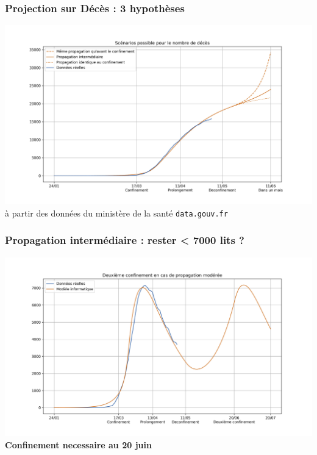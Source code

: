 \documentclass[a4paper]{cours-bdd}
\begin{document}

\begin{frame}[fragile]
\frametitle{Projection sur Décès : 3 hypothèses}

  \begin{center}
    \includegraphics[width=1.0\linewidth]{figure4.jpg} \\
    {\tiny à partir des données du ministère de la santé \texttt{data.gouv.fr}}
  \end{center}
  
\end{frame}


\begin{frame}[fragile]
\frametitle{Propagation intermédiaire : rester < 7000 lits ?}

  \begin{center}
    \includegraphics[width=1.0\linewidth]{figure5.jpg} \\

        \textbf{Confinement necessaire au 20 juin}
  \end{center}
  
\end{frame}
\end{document}
